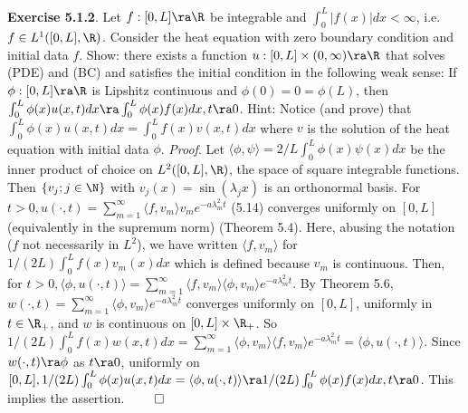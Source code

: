 {\bf Exercise 5.1.2}. Let $f: [0,L] \ra \R$ be integrable and $\int_0^L |f(x)|dx < \infty$, i.e. $f \in L^1([0,L],\R)$. Consider the heat equation with zero boundary condition and initial data $f$. Show:  there exists a function $u: [0,L] \times (0,\infty) \ra \R$ that solves (PDE) and (BC) and satisfies the initial condition in the following weak sense:  If $\phi: [0,L] \ra \R$ is Lipshitz continuous and $\phi(0) = 0 = \phi(L)$, then $\int_0^L \phi(x)u(x,t)dx \ra \int_0^L\phi(x)f(x)dx, t \ra 0$. Hint: Notice (and prove) that  $\int_0^L \phi(x)u(x,t)dx =\int_0^L f(x)v(x,t)dx$ where $v$ is the solution of the heat equation with initial data $\phi$. {\it Proof}. Let $\langle \phi, \psi \rangle = 2/L \int_0^L \phi(x) \psi(x) dx$ be the inner product of choice on $L^2([0,L], \R)$, the space of square integrable functions.  Then $\{v_j; j \in \N\}$ with $v_j(x)=\sin(\lambda_jx)$ is an orthonormal basis. For $t > 0, u(\cdot, t)=\sum_{m=1}^{\infty} \langle f, v_m \rangle v_m e^{-a \lambda_m^2 t}$ (5.14) converges uniformly on $[0,L]$ (equivalently in the supremum norm) (Theorem 5.4).  Here, abusing the notation ($f$ not necessarily in $L^2$), we have written $\langle f, v_m \rangle$ for $1/(2L) \int_0^L f(x) v_m(x)dx$ which is defined because $v_m$ is continuous. Then, for $t >0, \langle \phi, u(\cdot, t)\rangle = \sum_{m=1}^{\infty}\langle f, v_m \rangle \langle \phi, v_m \rangle e^{-a \lambda_m^2 t}$. By Theorem 5.6, $w(\cdot, t) =  \sum_{m=1}^{\infty}\langle \phi, v_m \rangle e^{-a \lambda_m^2 t}$ converges uniformly on $[0,L]$, uniformly in $t \in \R_+$, and $w$ is continuous on $[0,L] \times \R_+$. So $1/(2L) \int_0^L f(x)w(x,t)dx=\sum_{m=1}^{\infty}\langle \phi, v_m \rangle \langle f, v_m \rangle e^{-a \lambda_m^2 t} = \langle \phi, u(\cdot, t)\rangle $. Since $w(\cdot, t) \ra \phi$ as $t \ra 0$, uniformly on $[0,L], 1/(2L)\int_0^L \phi(x) u(x,t) dx = \langle \phi, u(\cdot, t)\rangle \ra 1/(2L)\int_0^L \phi(x) f(x) dx, t \ra 0$. This implies the assertion. $\qed$
